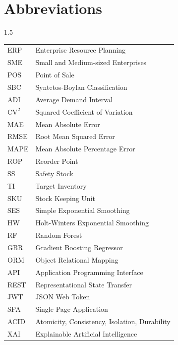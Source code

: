 \chapter*{Abbreviations}
\begin{spacing}{1.5}
\indent
\begin{tabular}{ll}
 ERP & Enterprise Resource Planning \\
 SME & Small and Medium-sized Enterprises \\
 POS & Point of Sale \\
 SBC & Syntetos-Boylan Classification \\
 ADI & Average Demand Interval \\
 $\text{CV}^2$ & Squared Coefficient of Variation \\
 MAE & Mean Absolute Error \\
 RMSE & Root Mean Squared Error \\
 MAPE & Mean Absolute Percentage Error \\
 ROP & Reorder Point \\
 SS & Safety Stock \\
 TI & Target Inventory \\
 SKU & Stock Keeping Unit \\
 SES & Simple Exponential Smoothing \\
 HW & Holt-Winters Exponential Smoothing \\
 RF & Random Forest \\
 GBR & Gradient Boosting Regressor \\
 ORM & Object Relational Mapping \\
 API & Application Programming Interface \\
 REST & Representational State Transfer \\
 JWT & JSON Web Token \\
 SPA & Single Page Application \\
 ACID & Atomicity, Consistency, Isolation, Durability \\
 XAI & Explainable Artificial Intelligence \\
\end{tabular}   
\end{spacing}
